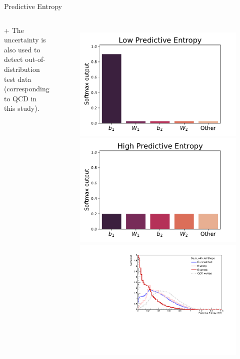 \documentclass[10pt]{beamer}
\begin{document}
\begin{frame}[fragile]{Predictive Entropy}
\begin{columns}[T,onlytextwidth]
        + The uncertainty is also used to detect out-of-distribution test data (corresponding to QCD in this study).
        \begin{figure}
            \centering
            \includegraphics[width=\textwidth]{figures/misc/low-entropy.pdf}
            \includegraphics[width=\textwidth]{figures/misc/high-entropy.pdf}
            \includegraphics[width=\textwidth]{figures/entropy/entropy_with_jet_shape.pdf}
        \end{figure}
    \end{columns}
    
    
\end{frame}
\end{document}

